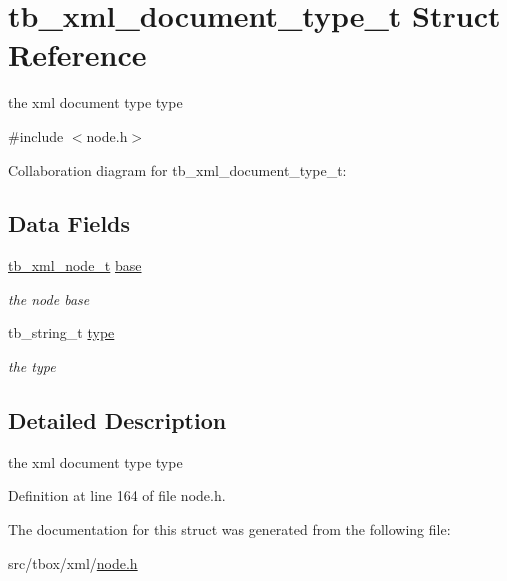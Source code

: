 \hypertarget{structtb__xml__document__type__t}{\section{tb\-\_\-xml\-\_\-document\-\_\-type\-\_\-t Struct Reference}
\label{structtb__xml__document__type__t}
}


the xml document type type  




{\ttfamily \#include $<$node.\-h$>$}



Collaboration diagram for tb\-\_\-xml\-\_\-document\-\_\-type\-\_\-t\-:
\subsection*{Data Fields}
\begin{DoxyCompactItemize}
\item 
\hypertarget{structtb__xml__document__type__t_a2db0f6108350904ae5d3eba7873954d4}{\hyperlink{structtb__xml__node__t}{tb\-\_\-xml\-\_\-node\-\_\-t} \hyperlink{structtb__xml__document__type__t_a2db0f6108350904ae5d3eba7873954d4}{base}}\label{structtb__xml__document__type__t_a2db0f6108350904ae5d3eba7873954d4}

\begin{DoxyCompactList}\small\item\em the node base \end{DoxyCompactList}\item 
\hypertarget{structtb__xml__document__type__t_a14831046244d388cddbf4d53feac2f08}{tb\-\_\-string\-\_\-t \hyperlink{structtb__xml__document__type__t_a14831046244d388cddbf4d53feac2f08}{type}}\label{structtb__xml__document__type__t_a14831046244d388cddbf4d53feac2f08}

\begin{DoxyCompactList}\small\item\em the type \end{DoxyCompactList}\end{DoxyCompactItemize}


\subsection{Detailed Description}
the xml document type type 

Definition at line 164 of file node.\-h.



The documentation for this struct was generated from the following file\-:\begin{DoxyCompactItemize}
\item 
src/tbox/xml/\hyperlink{node_8h}{node.\-h}\end{DoxyCompactItemize}
